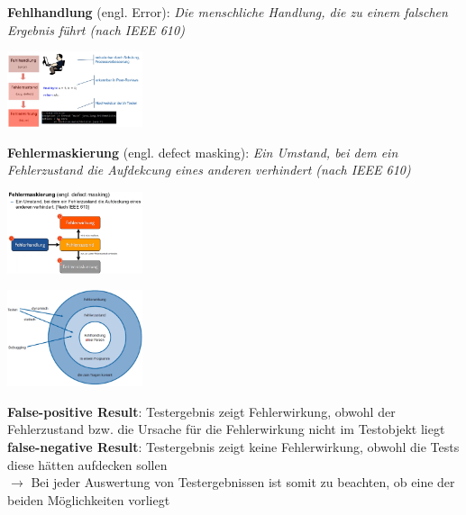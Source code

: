\documentclass{report}
\newenvironment{Figure}
	{\par\medskip\noindent\minipage{\linewidth}}
	{\endminipage\par\medskip}
\theoremstyle{definition}
\theoremstyle{example}
\begin{document}
\textbf{Fehlhandlung} (engl. Error): \textit{Die menschliche Handlung, die zu einem falschen Ergebnis führt (nach IEEE 610)}\\

\begin{Figure}
   \centering
    \includegraphics[width=150px]{img/Fehlerbegriffe.png}
        \label{fig:Fehlerbegriffe}
    \end{Figure}

\textbf{Fehlermaskierung} (engl. defect masking): \textit{Ein Umstand, bei dem ein Fehlerzustand die Aufdekcung eines anderen verhindert (nach IEEE 610)}

\begin{Figure}
   \centering
    \includegraphics[width=150px]{img/Fehlermaskierung.png}
        \label{fig:Fehlermaskierung}
    \end{Figure}

    \begin{Figure}
      \centering
       \includegraphics[width=150px]{img/ZusammenhangFehler.png}
           \label{fig:ZusammenhangFehler}
       \end{Figure}

\textbf{False-positive Result}: Testergebnis zeigt Fehlerwirkung, obwohl der Fehlerzustand bzw. die Ursache für die Fehlerwirkung nicht im Testobjekt liegt\\

\textbf{false-negative Result}: Testergebnis zeigt keine Fehlerwirkung, obwohl die Tests diese hätten aufdecken sollen\\
$\rightarrow$ Bei jeder Auswertung von Testergebnissen ist somit zu beachten, ob eine der beiden Möglichkeiten vorliegt\\
\end{document}
